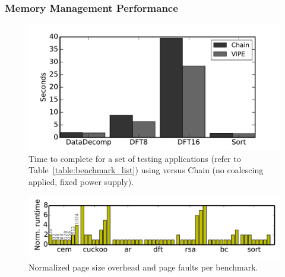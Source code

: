 
\subsubsection{Memory Management Performance}
\label{sec:results_memory_management}

\begin{figure}
	\centering
	\includegraphics[width=\columnwidth]{figures/chain_vipe}
	\caption{Time to complete for a set of testing applications (refer to Table~\ref{table:benchmark_list}) using \sys versus Chain (no coalescing applied, fixed power supply). }
	\label{fig:IPOSPerformance}
\end{figure}

\begin{figure}
	\centering
	\includegraphics[width=\columnwidth]{figures/pagSizeOverhead}
	\caption{Normalized page size overhead and page faults per benchmark.}
	\label{fig:IPOSPerformance}
	\label{fig:page_size}
\end{figure}

